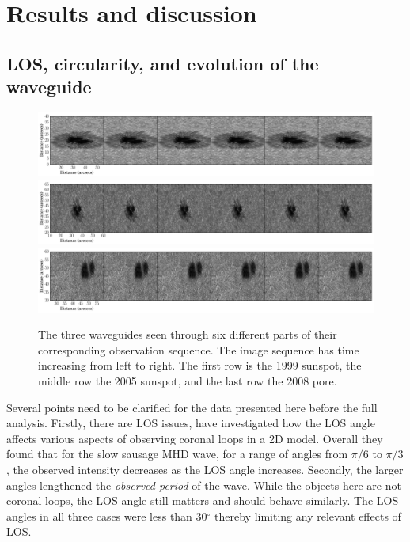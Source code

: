 \section{Results and discussion}

\subsection{LOS, circularity, and evolution of the waveguide}

    \begin{figure}
		\centering
        \includegraphics[height=0.19\textheight,width=\textwidth]{1999.pdf}\vspace*{-0.2cm}
        \includegraphics[height=0.19\textheight,width=\textwidth]{2005.pdf}\vspace*{-0.2cm}
        \includegraphics[height=0.19\textheight,width=\textwidth]{2008.pdf}\vspace*{-0.2cm}
        \caption{
            The three waveguides seen through six different parts of their corresponding observation sequence.
            The image sequence has time increasing from left to right.
            The first row is the 1999 sunspot, the middle row the 2005 sunspot, and the last row the 2008 pore.
                }
        \label{data}
    \end{figure}
	
	Several points need to be clarified for the data presented here before the full analysis.
	Firstly, there are LOS issues, \citet{2003A&A...397..765C,2003A&A...409..325C} have investigated how the LOS angle affects various aspects of observing coronal loops in a 2D model.
	Overall they found that for the slow sausage MHD wave, for a range of angles from $\pi/6$ to $\pi/3$, the observed intensity decreases as the LOS angle increases.
	Secondly, the larger angles lengthened the \textit{observed period} of the wave.
	While the objects here are not coronal loops, the LOS angle still matters and should behave similarly.
	The LOS angles in all three cases were less than 30$^\circ$ thereby limiting any relevant effects of LOS.
	
